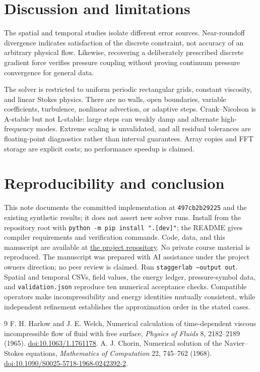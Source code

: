 \documentclass[10pt,a4paper]{article}
\begin{document}
\section{Discussion and limitations}
The spatial and temporal studies isolate different error sources. Near-roundoff divergence indicates satisfaction of the discrete constraint, not accuracy of an arbitrary physical flow. Likewise, recovering a deliberately prescribed discrete gradient force verifies pressure coupling without proving continuum pressure convergence for general data.

The solver is restricted to uniform periodic rectangular grids, constant viscosity, and linear Stokes physics. There are no walls, open boundaries, variable coefficients, turbulence, nonlinear advection, or adaptive steps. Crank--Nicolson is A-stable but not L-stable: large steps can weakly damp and alternate high-frequency modes. Extreme scaling is unvalidated, and all residual tolerances are floating-point diagnostics rather than interval guarantees. Array copies and FFT storage are explicit costs; no performance speedup is claimed.
\section{Reproducibility and conclusion}
This note documents the committed implementation at \texttt{497cb2b29225} and the existing synthetic results; it does not assert new solver runs. Install from the repository root with \texttt{python -m pip install ".[dev]"}; the README gives compiler requirements and verification commands. Code, data, and this manuscript are available at \href{https://github.com/racostacme-come/staggerlab}{the project repository}. No private course material is reproduced. The manuscript was prepared with AI assistance under the project owner\textquotesingle s direction; no peer review is claimed.
Run \texttt{staggerlab --output out}. Spatial and temporal CSVs, field values, the energy ledger, pressure-symbol data, and \texttt{validation.json} reproduce ten numerical acceptance checks. Compatible operators make incompressibility and energy identities mutually consistent, while independent refinement establishes the approximation order in the stated cases.
\begin{thebibliography}{9}
 F. H. Harlow and J. E. Welch, Numerical calculation of time-dependent viscous incompressible flow of fluid with free surface, \emph{Physics of Fluids} 8, 2182--2189 (1965). \href{https://doi.org/10.1063/1.1761178}{doi:10.1063/1.1761178}.
 A. J. Chorin, Numerical solution of the Navier--Stokes equations, \emph{Mathematics of Computation} 22, 745--762 (1968). \href{https://doi.org/10.1090/S0025-5718-1968-0242392-2}{doi:10.1090/S0025-5718-1968-0242392-2}.
\end{thebibliography}
\end{document}
